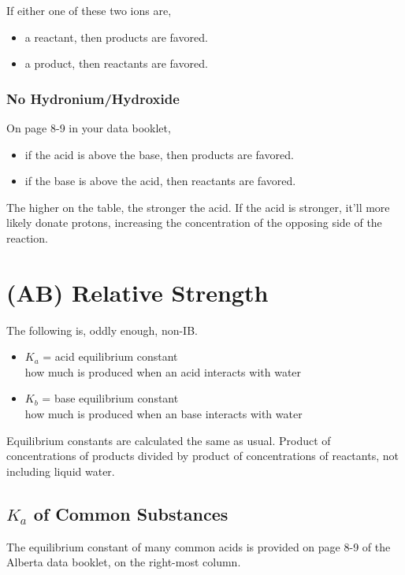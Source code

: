\documentclass[a4paper,12pt]{article}
\begin{document}
If either one of these two ions are,
\begin{itemize}
    \item{a reactant, then products are favored. \ce{->[$>99.9\%$]}}
    \item{a product, then reactants are favored. \ce{<=>[$<50\%$]}}
\end{itemize}

\subsubsection{No Hydronium/Hydroxide}
On page 8-9 in your data booklet,
\begin{itemize}
    \item{if the acid is above the base, then products are favored. \ce{->[$>99.9\%$]}}
    \item{if the base is above the acid, then reactants are favored. \ce{<=>[$<50\%$]}}
\end{itemize}

The higher on the table, the stronger the acid. If the acid is stronger, it'll more likely donate protons, increasing the concentration of the opposing side of the reaction.

\section{(AB) Relative Strength}
The following is, oddly enough, non-IB.

\begin{itemize}
    \item{$K_a$ = acid equilibrium constant \\ how much  is produced when an acid interacts with water}
    \item{$K_b$ = base equilibrium constant \\ how much  is produced when an base interacts with water}
\end{itemize}

Equilibrium constants are calculated the same as usual. Product of concentrations of products divided by product of concentrations of reactants, not including liquid water.

\subsection{$K_a$ of Common Substances}
The equilibrium constant of many common acids is provided on page 8-9 of the Alberta data booklet, on the right-most column.
\end{document}
